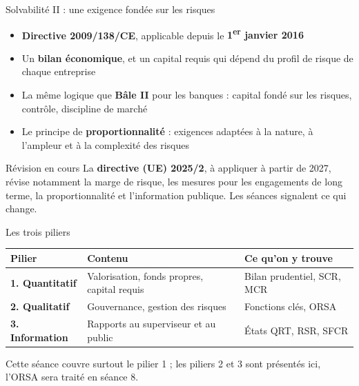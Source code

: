 \documentclass[10pt,aspectratio=169]{beamer}
\begin{document}
\begin{frame}{Solvabilité II : une exigence fondée sur les risques}
\begin{itemize}
  \item \textbf{Directive 2009/138/CE}, applicable depuis le \textbf{1\textsuperscript{er} janvier 2016}
  \item Un \textbf{bilan économique}, et un capital requis qui dépend du profil de risque de chaque entreprise
  \item La même logique que \textbf{Bâle II} pour les banques : capital fondé sur les risques, contrôle, discipline de marché
  \item Le principe de \textbf{proportionnalité} : exigences adaptées à la nature, à l'ampleur et à la complexité des risques
\end{itemize}
\vspace{0.3cm}
\begin{block}{Révision en cours}
La \textbf{directive (UE) 2025/2}, à appliquer à partir de 2027, révise notamment la marge de
risque, les mesures pour les engagements de long terme, la proportionnalité et l'information
publique. Les séances signalent ce qui change.
\end{block}
\end{frame}

\begin{frame}{Les trois piliers}
\begin{table}
\centering
\renewcommand{\arraystretch}{1.5}
\begin{tabular}{p{2.3cm}p{5.2cm}p{5.2cm}}
\toprule
\textbf{Pilier} & \textbf{Contenu} & \textbf{Ce qu'on y trouve} \\
\midrule
\textbf{1. Quantitatif} & Valorisation, fonds propres, capital requis & Bilan prudentiel, SCR, MCR \\
\textbf{2. Qualitatif} & Gouvernance, gestion des risques & Fonctions clés, ORSA \\
\textbf{3. Information} & Rapports au superviseur et au public & États QRT, RSR, SFCR \\
\bottomrule
\end{tabular}
\end{table}
\vspace{0.2cm}
\begin{center}
\small Cette séance couvre surtout le pilier 1 ; les piliers 2 et 3 sont présentés ici, l'ORSA
sera traité en séance 8.
\end{center}
\end{frame}
\end{document}
